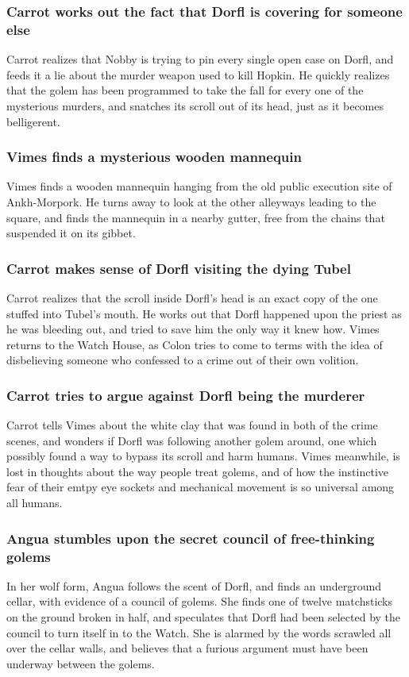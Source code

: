 \subsubsection{\Gls{Carrot} works out the fact that \Gls{Dorfl} is covering for someone else}
\Gls{Carrot} realizes that \Gls{Nobby} is trying to pin every single open case on \Gls{Dorfl}, and
feeds it a lie about the murder weapon used to kill \Gls{Hopkin}. He quickly realizes that the
golem has been programmed to take the fall for every one of the mysterious murders, and snatches its
scroll out of its head, just as it becomes belligerent.

\subsubsection{\Gls{Vimes} finds a mysterious wooden mannequin}
\Gls{Vimes} finds a wooden mannequin hanging from the old public execution site of Ankh-Morpork.
He turns away to look at the other alleyways leading to the square, and finds the mannequin in a
nearby gutter, free from the chains that suspended it on its gibbet.

\subsubsection{\Gls{Carrot} makes sense of \Gls{Dorfl} visiting the dying \Gls{Tubel}}
\Gls{Carrot} realizes that the scroll inside \Gls{Dorfl}'s head is an exact copy of the one stuffed
into \Gls{Tubel}'s mouth. He works out that \Gls{Dorfl} happened upon the priest as he was bleeding
out, and tried to save him the only way it knew how. \Gls{Vimes} returns to the Watch House, as
\Gls{Colon} tries to come to terms with the idea of disbelieving someone who confessed to a crime
out of their own volition.

\subsubsection{\Gls{Carrot} tries to argue against \Gls{Dorfl} being the murderer}
\Gls{Carrot} tells \Gls{Vimes} about the white clay that was found in both of the crime scenes, and
wonders if \Gls{Dorfl} was following another golem around, one which possibly found a way to
bypass its scroll and harm humans. \Gls{Vimes} meanwhile, is lost in thoughts about the way people
treat golems, and of how the instinctive fear of their emtpy eye sockets and mechanical movement
is so universal among all humans.

\subsubsection{\Gls{Angua} stumbles upon the secret council of free-thinking golems}
In her wolf form, \Gls{Angua} follows the scent of \Gls{Dorfl}, and finds an underground cellar,
with evidence of a council of golems. She finds one of twelve matchsticks on the ground broken in
half, and speculates that \Gls{Dorfl} had been selected by the council to turn itself in to the
Watch. She is alarmed by the words scrawled all over the cellar walls, and believes that a furious
argument must have been underway between the golems.

